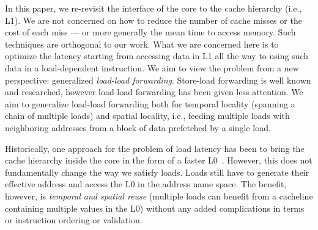 \documentclass{sig-alternate}
\begin{document}
In this paper, we re-revisit the interface of the core to the cache hierarchy (i.e., L1). We are not concerned on how to reduce the number of cache misses or the cost of each miss --- or more generally the mean time to access memory. Such techniques are orthogonal to our work. What we are concerned here is to optimize the latency starting from accessing data in L1 all the way to using such data in a load-dependent instruction. We aim to view the problem from a new perspective: 
generalized \emph{load-load forwarding}. Store-load forwarding is well known and researched, however load-load forwarding has been given less attention. We aim to generalize load-load forwarding both for temporal locality (spanning a chain of multiple loads) and spatial locality, i.e., feeding multiple loads with neighboring addresses from a block of data prefetched by a single load.

Historically, one approach for the problem of load latency has been to bring the cache hierarchy inside the core in the form of a faster L0~\cite{FilterCache/kin97, FilterCache2/bellas99, FilterCache3/giorgi07}. However, this does not fundamentally change the way we satisfy loads.  Loads still have to generate their effective address and access the L0 in the address name space. The benefit, however, is \emph{temporal and spatial reuse} (multiple loads can benefit from a cacheline containing multiple values in the L0) without any added complications in terms or instruction ordering or validation. 
\end{document}
